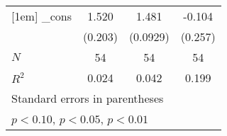 {\begin{tabular}{l*{3}{c}}
[1em]
\_cons      &       1.520\sym{***}&       1.481\sym{***}&      -0.104         \\
            &     (0.203)         &    (0.0929)         &     (0.257)         \\
\hline
\(N\)       &          54         &          54         &          54         \\
\(R^{2}\)   &       0.024         &       0.042         &       0.199         \\
\hline\hline
\multicolumn{4}{l}{\footnotesize Standard errors in parentheses}\\
\multicolumn{4}{l}{\footnotesize \sym{*} \(p<0.10\), \sym{**} \(p<0.05\), \sym{***} \(p<0.01\)}\\
\end{tabular}
}
